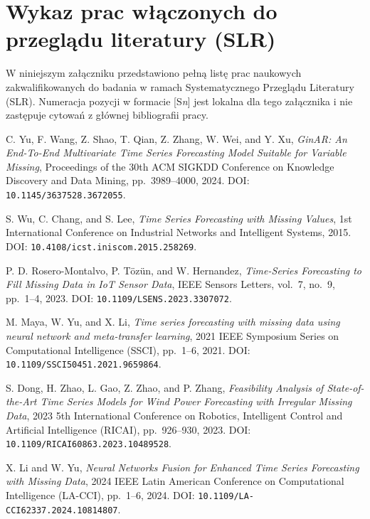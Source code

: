 \appendix
\chapter{Wykaz prac włączonych do przeglądu literatury (SLR)}
\label{chap:zalacznik_slr}

W niniejszym załączniku przedstawiono pełną listę prac naukowych zakwalifikowanych
do badania w ramach Systematycznego Przeglądu Literatury (SLR). Numeracja pozycji
w formacie [S\textit{n}] jest lokalna dla tego załącznika i nie zastępuje cytowań
z głównej bibliografii pracy.

\begin{enumerate}[label={[S\arabic*]}]
    \item %
    C. Yu, F. Wang, Z. Shao, T. Qian, Z. Zhang, W. Wei, and Y. Xu, \textit{GinAR: An End-To-End Multivariate Time Series Forecasting Model Suitable for Variable Missing}, Proceedings of the 30th ACM SIGKDD Conference on Knowledge Discovery and Data Mining, pp.~3989–4000, 2024. DOI: \texttt{10.1145/3637528.3672055}.
    \item %
    S. Wu, C. Chang, and S. Lee, \textit{Time Series Forecasting with Missing Values}, 1st International Conference on Industrial Networks and Intelligent Systems, 2015. DOI: \texttt{10.4108/icst.iniscom.2015.258269}.
    \item %
    P. D. Rosero-Montalvo, P. Tözün, and W. Hernandez, \textit{Time-Series Forecasting to Fill Missing Data in IoT Sensor Data}, IEEE Sensors Letters, vol.~7, no.~9, pp.~1–4, 2023. DOI: \texttt{10.1109/LSENS.2023.3307072}.
    \item %
    M. Maya, W. Yu, and X. Li, \textit{Time series forecasting with missing data using neural network and meta-transfer learning}, 2021 IEEE Symposium Series on Computational Intelligence (SSCI), pp.~1–6, 2021. DOI: \texttt{10.1109/SSCI50451.2021.9659864}.
    \item %
    S. Dong, H. Zhao, L. Gao, Z. Zhao, and P. Zhang, \textit{Feasibility Analysis of State-of-the-Art Time Series Models for Wind Power Forecasting with Irregular Missing Data}, 2023 5th International Conference on Robotics, Intelligent Control and Artificial Intelligence (RICAI), pp.~926–930, 2023. DOI: \texttt{10.1109/RICAI60863.2023.10489528}.
    \item %
    X. Li and W. Yu, \textit{Neural Networks Fusion for Enhanced Time Series Forecasting with Missing Data}, 2024 IEEE Latin American Conference on Computational Intelligence (LA-CCI), pp.~1–6, 2024. DOI: \texttt{10.1109/LA-CCI62337.2024.10814807}.

\end{enumerate}
